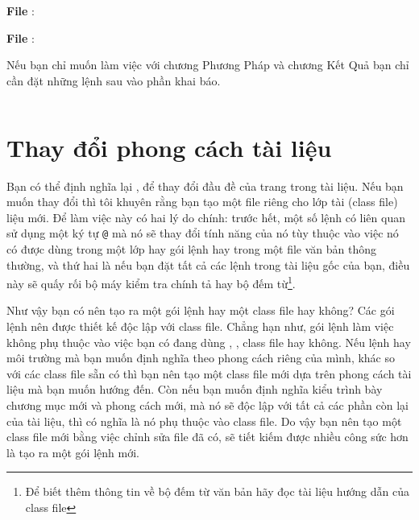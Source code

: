 \documentclass[a4paper]{report}
\begin{document}


\noindent \textbf{File} :



\noindent \textbf{File} :



Nếu bạn chỉ muốn làm việc với chương Phương Pháp và chương Kết Quả bạn chỉ cần đặt những lệnh sau vào phần khai báo.

\begin{verbatim}

\end{verbatim}


\chapter{Thay đổi phong cách tài liệu}
\label{ch:mythesis}

Bạn có thể định nghĩa lại ,  để thay đổi đầu đề của trang trong tài liệu. Nếu bạn muốn thay đổi thì tôi khuyên rằng bạn tạo một file riêng cho lớp tài (class file) liệu mới. Để làm việc này có hai lý do chính:
trước hết, một số lệnh có liên quan sử dụng một  ký tự \verb|@| mà nó sẽ thay đổi tính năng của nó tùy thuộc vào việc nó có được dùng trong một lớp hay gói lệnh hay trong một file văn bản thông thường, và thứ hai là nếu bạn đặt tất cả các lệnh trong tài liệu gốc của bạn, điều này sẽ quấy rối bộ máy kiểm tra chính tả hay bộ đếm từ\footnote{Để biết thêm thông tin về bộ đếm từ văn bản hãy đọc tài liệu hướng dẫn của class file }.

Như vậy bạn có nên tạo ra một gói lệnh hay một class file hay không? Các gói lệnh nên được thiết kế độc lập với class file. Chẳng hạn như, gói lệnh  làm việc không phụ thuộc vào việc bạn có đang dùng , ,  class file hay không. Nếu lệnh hay môi trường mà bạn muốn định nghĩa theo phong cách riêng của mình, khác so với các class file sẵn có thì bạn nên tạo một class file mới dựa trên phong cách tài liệu mà bạn muốn hướng đến. Còn nếu bạn muốn định nghĩa kiểu trình bày chương mục mới và phong cách mới, mà nó sẽ độc lập với tất cả các phần còn lại của tài liệu, thì có nghĩa là nó phụ thuộc vào class file. Do vậy bạn nên tạo một  class file mới bằng việc chỉnh sửa file đã có, sẽ tiết kiếm được nhiều công sức hơn là tạo ra một gói lệnh mới.
\end{document}
